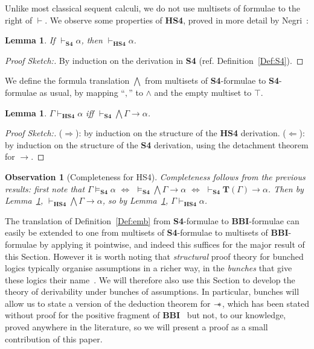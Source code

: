 \documentclass[a4paper]{article}
\newtheorem{lemma}[theorem]{Lemma}
\newtheorem{observation}[theorem]{Observation}
\newcommand\magicwand{\mathrel{-\mkern-6mu*}}
\newcommand{\BBI}{\textbf{BBI}\xspace}
\newcommand{\SFour}{\textbf{S4}\xspace}
\begin{document}
Unlike most classical sequent calculi, we do not use multisets of formulae to the right of $\vdash$. We observe some properties of \textbf{HS4}, proved in more detail by Negri~\cite{SaraNegriNewBook}:

\begin{lemma}\label{lemma_HS4_a}
 If $\vdash_{\SFour} \alpha$, then $\vdash_{\textbf{HS4}} \alpha$.   
\end{lemma}
\begin{proof}[Proof Sketch:] By induction on the derivation in \textbf{S4} (ref. Definition~\ref{Def:S4}).
\end{proof}

We define the formula translation $\bigwedge$ from multisets of \SFour-formulae to \SFour-formulae as usual, by mapping ``$,$'' to $\land$ and the empty multiset to $\top$.

\begin{lemma}\label{lemma_HS4_b}
     $\Gamma \vdash_{\textbf{HS4}} \alpha$ iff $\vdash_{\SFour}\bigwedge\Gamma \rightarrow \alpha$. 
\end{lemma}
\begin{proof}[Proof Sketch:] ($\Rightarrow$): by induction on the structure of the \textbf{HS4} derivation. ($\Leftarrow$): by induction on the structure of the \SFour derivation, using the detachment theorem for $\rightarrow$.    
\end{proof}

\begin{observation}[Completeness for HS4] \label{HS4_Completeness}
Completeness follows from the previous results:
first note that $\Gamma \vDash_{\SFour}\alpha$ $\Leftrightarrow$ $\vDash_{\SFour} \bigwedge\Gamma\rightarrow \alpha$ $\Leftrightarrow$ $\vdash_{\SFour}\mathbf{T}(\Gamma) \rightarrow \alpha$.
Then by Lemma~\ref{lemma_HS4_a}, $\vdash_{\textbf{HS4}}\bigwedge\Gamma \rightarrow \alpha$, so by
Lemma~\ref{lemma_HS4_b}, $\Gamma\vdash_{\textbf{HS4}} \alpha$.
\end{observation}

The translation of Definition~\ref{Def:emb} from \SFour-formulae to \BBI-formulae can easily be extended to one from multisets of \SFour-formulae to multisets of \BBI-formulae by applying it pointwise, and indeed this suffices for the major result of this Section.
However it is worth noting that \emph{structural} proof theory for bunched logics typically organise assumptions in a richer way,
in the \emph{bunches} that give these logics their name~\cite{pym_semantics_2002}.
We will therefore also use this Section to develop the theory of derivability under bunches of assumptions.
In particular, bunches will allow us to state a version of the deduction theorem for $\magicwand$, which has been stated without proof for the positive fragment of \BBI~\cite{deduction_theorem} but not, to our knowledge, proved anywhere in the literature, so we will present a proof as a small contribution of this paper.
\end{document}

